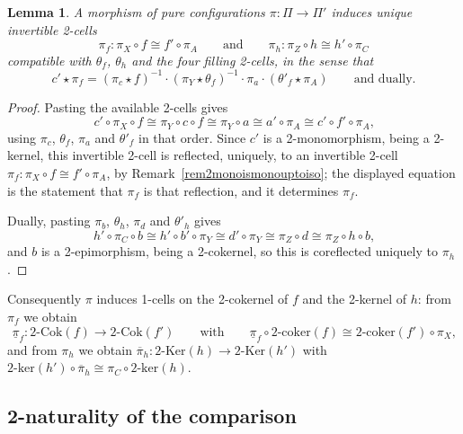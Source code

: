 \documentclass[reqno,a4paper]{amsart}
\numberwithin{equation}{section}
\theoremstyle{plain}
\newtheorem{lemma}[subsection]{Lemma}
\theoremstyle{definition}
\def\nameit#1{\textrm{#1}~}
\def\remx{\nameit{Remark}}
\newcommand{\comp}{\circ}
\newcommand{\iso}{\cong}
\newcommand{\ov}[1]{\overline{#1}}
\renewcommand{\1}{\onecat{1}}
\newcommand{\TwoKer}{\ensuremath{2\text{-}\mathrm{Ker}}}
\newcommand{\TwoCoker}{\ensuremath{2\text{-}\mathrm{Cok}}}
\newcommand{\twoker}{\ensuremath{2\text{-}\mathrm{ker}}}
\newcommand{\twocoker}{\ensuremath{2\text{-}\mathrm{coker}}}
\begin{document}
\begin{lemma}\label{L:InducedVerticals}
	A morphism of pure configurations \(\pi\colon\Pi\to\Pi'\) induces unique invertible 2-cells
	\[
		\pi_f\colon\pi_X\comp f\iso f'\comp\pi_A
		\qquad\text{and}\qquad
		\pi_h\colon\pi_Z\comp h\iso h'\comp\pi_C
	\]
	compatible with \(\theta_f\), \(\theta_h\) and the four filling 2-cells, in the sense that
	\[
		c'\star\pi_f=(\pi_c\star f)^{-1}\cdot(\pi_Y\star\theta_f)^{-1}\cdot\pi_a\cdot(\theta'_f\star\pi_A)
		\qquad\text{and dually.}
	\]
\end{lemma}
\begin{proof}
	Pasting the available 2-cells gives
	\[
		c'\comp\pi_X\comp f\iso\pi_Y\comp c\comp f\iso\pi_Y\comp a\iso a'\comp\pi_A\iso c'\comp f'\comp\pi_A\text{,}
	\]
	using \(\pi_c\), \(\theta_f\), \(\pi_a\) and \(\theta'_f\) in that order. Since \(c'\) is a 2-monomorphism, being a 2-kernel, this invertible 2-cell is reflected, uniquely, to an invertible 2-cell \(\pi_f\colon\pi_X\comp f\iso f'\comp\pi_A\), by \remx\ref{rem2monoismonouptoiso}; the displayed equation is the statement that \(\pi_f\) is that reflection, and it determines \(\pi_f\).

	Dually, pasting \(\pi_b\), \(\theta_h\), \(\pi_d\) and \(\theta'_h\) gives
	\[
		h'\comp\pi_C\comp b\iso h'\comp b'\comp\pi_Y\iso d'\comp\pi_Y\iso\pi_Z\comp d\iso\pi_Z\comp h\comp b\text{,}
	\]
	and \(b\) is a 2-epimorphism, being a 2-cokernel, so this is coreflected uniquely to \(\pi_h\).
\end{proof}

Consequently \(\pi\) induces 1-cells on the 2-cokernel of \(f\) and the 2-kernel of \(h\): from \(\pi_f\) we obtain
\[
	\underline{\pi}_f\colon\TwoCoker(f)\to\TwoCoker(f')
	\qquad\text{with}\qquad
	\underline{\pi}_f\comp\twocoker(f)\iso\twocoker(f')\comp\pi_X\text{,}
\]
and from \(\pi_h\) we obtain \(\ov{\pi}_h\colon\TwoKer(h)\to\TwoKer(h')\) with \(\twoker(h')\comp\ov{\pi}_h\iso\pi_C\comp\twoker(h)\).

\subsection{2-naturality of the comparison}\label{SS:NaturalComparison}
\end{document}
